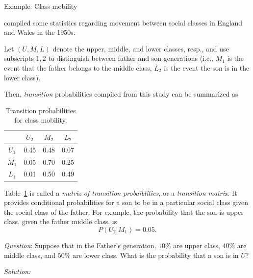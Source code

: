 \begin{frame}[allowframebreaks]{Example: Class mobility}

  \citet{glass13} compiled some statistics regarding movement between social classes in England and Wales in the 1950s.
  
  Let $(U, M, L)$ denote the upper, middle, and lower classes, resp., and use subscripts $1, 2$ to distinguish between father and son generations (i.e., $M_1$ is the event that the father belongs to the middle class, $L_2$ is the event the son is in the lower class).
  
  Then, \emph{transition} probabilities compiled from this study can be summarized as
 
  \framebreak
  
  \begin{table}
  \centering
  \caption{\label{tab:mobility}Transition probabilities for class mobility.}
    \begin{tabular}{c|ccc}
            & $U_2$ & $M_2$ & $L_2$ \\\hline
      $U_1$ & 0.45  & 0.48  & 0.07  \\
      $M_1$ & 0.05  & 0.70  & 0.25  \\
      $L_1$ & 0.01  & 0.50  & 0.49  \\
    \end{tabular}
  \end{table}
  
  Table~\ref{tab:mobility} is called a \emph{matrix of transition probaiblities}, or a \emph{transition matrix}. 
  It provides conditional probabilities for a son to be in a particular social class given the social class of the father.
  For example, the probability that the son is upper class, given the father middle class, is
  $$
  P(U_2 | M_1) = 0.05.
  $$
  
  \framebreak
  
  \emph{Question}: Suppose that in the Father's generation, $10\%$ are upper class, $40\%$ are middle class, and $50\%$ are lower class. What is the probability that a son is in $U$? 

  \emph{Solution:}
  

\end{frame}

